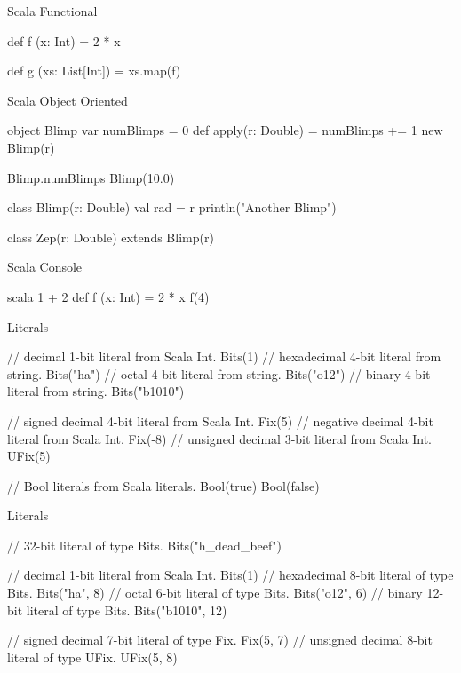 \documentclass[xcolor=pdflatex,dvipsnames,table]{beamer}
\newenvironment{FramedVerb}%
{\VerbatimEnvironment
\begin{Sbox}\begin{minipage}{.94\textwidth}\begin{Verbatim}}%
{\end{Verbatim}\end{minipage}\end{Sbox}
\setlength{\fboxsep}{8pt}\fbox{\TheSbox}}
\begin{document}
\begin{frame}[fragile]{Scala Functional}

\begin{scala}
def f (x: Int) = 2 * x

def g (xs: List[Int]) =  xs.map(f)
\end{scala}
\end{frame}

\begin{frame}{Scala Object Oriented}

\begin{scala}
object Blimp {
  var numBlimps = 0
  def apply(r: Double) = {
    numBlimps += 1
    new Blimp(r)
  }
}

Blimp.numBlimps
Blimp(10.0)

class Blimp(r: Double) {
  val rad = r
  println("Another Blimp")
}

class Zep(r: Double) extends Blimp(r)
\end{scala}

\end{frame}

\begin{frame}[fragile]{Scala Console}
\begin{scala}
scala
1 + 2
def f (x: Int) = 2 * x
f(4)
\end{scala}
\end{frame}


\begin{frame}[fragile]{Literals}
\begin{scala}
// decimal 1-bit literal from Scala Int. 
Bits(1)       
// hexadecimal 4-bit literal from string.
Bits("ha")    
// octal 4-bit literal from string. 
Bits("o12")   
// binary 4-bit literal from string.
Bits("b1010") 

// signed decimal 4-bit literal from Scala Int.
Fix(5)        
// negative decimal 4-bit literal from Scala Int.
Fix(-8)       
// unsigned decimal 3-bit literal from Scala Int.
UFix(5)       

// Bool literals from Scala literals.
Bool(true)    
Bool(false)
\end{scala}
\end{frame}
 
\begin{frame}[fragile]{Literals}
\begin{scala}
// 32-bit literal of type Bits.
Bits("h_dead_beef") 

// decimal 1-bit literal from Scala Int.
Bits(1)             
// hexadecimal 8-bit literal of type Bits.
Bits("ha", 8)       
// octal 6-bit literal of type Bits.
Bits("o12", 6)      
// binary 12-bit literal of type Bits.
Bits("b1010", 12)   

// signed decimal 7-bit literal of type Fix.
Fix(5, 7)           
// unsigned decimal 8-bit literal of type UFix.
UFix(5, 8)          
\end{scala}
\end{frame}
\end{document}
